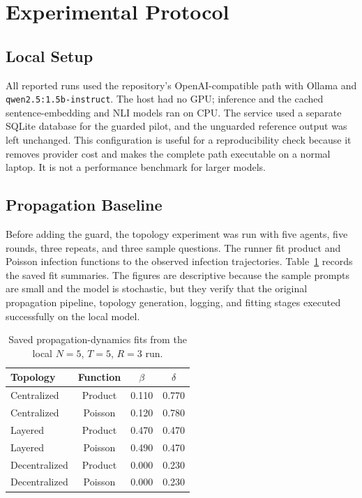 \documentclass[journal]{IEEEtran}
\begin{document}
\section{Experimental Protocol}

\subsection{Local Setup}

All reported runs used the repository's OpenAI-compatible path with Ollama and \texttt{qwen2.5:1.5b-instruct}. The host had no GPU; inference and the cached sentence-embedding and NLI models ran on CPU. The service used a separate SQLite database for the guarded pilot, and the unguarded reference output was left unchanged. This configuration is useful for a reproducibility check because it removes provider cost and makes the complete path executable on a normal laptop. It is not a performance benchmark for larger models.

\subsection{Propagation Baseline}

Before adding the guard, the topology experiment was run with five agents, five rounds, three repeats, and three sample questions. The runner fit product and Poisson infection functions to the observed infection trajectories. Table~\ref{tab:topology} records the saved fit summaries. The figures are descriptive because the sample prompts are small and the model is stochastic, but they verify that the original propagation pipeline, topology generation, logging, and fitting stages executed successfully on the local model.

\begin{table}[t]
\caption{Saved propagation-dynamics fits from the local $N=5$, $T=5$, $R=3$ run.}
\label{tab:topology}
\centering
\scriptsize
\begin{tabular}{lccc}
\hline
Topology & Function & $\beta$ & $\delta$ \\
\hline
Centralized & Product & 0.110 & 0.770 \\
Centralized & Poisson  & 0.120 & 0.780 \\
Layered     & Product & 0.470 & 0.470 \\
Layered     & Poisson  & 0.490 & 0.470 \\
Decentralized & Product & 0.000 & 0.230 \\
Decentralized & Poisson  & 0.000 & 0.230 \\
\hline
\end{tabular}
\end{table}
\end{document}

